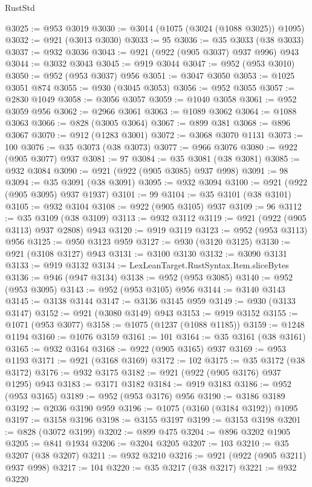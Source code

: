 \begin{lexlean}{RustStd}
\begin{coremodule}
@3025 := @953 @3019
@3030 := @3014 (@1075 (@3024 (@1088 @3025)) @1095)
@3032 := @921 (@3013 @3030)
@3033 := 95
@3036 := @35 @3033 (@38 @3033)
@3037 := @932 @3036
@3043 := @921 (@922 (@905 @3037) @937 @996) @943
@3044 := @3032 @3043
@3045 := @919 @3044
@3047 := @952 (@953 @3010)
@3050 := @952 (@953 @3037) @956
@3051 := @3047 @3050
@3053 := @1025 @3051 @874
@3055 := @930 (@3045 @3053)
@3056 := @952 @3055
@3057 := @2830 @1049
@3058 := @3056 @3057
@3059 := @1040 @3058
@3061 := @952 @3059 @956
@3062 := @2966 @3061
@3063 := @1089 @3062
@3064 := @1088 @3063
@3066 := @828 (@3005 @3064)
@3067 := @899 @381
@3068 := @896 @3067
@3070 := @912 (@1283 @3001)
@3072 := @3068 @3070 @1131
@3073 := 100
@3076 := @35 @3073 (@38 @3073)
@3077 := @966 @3076
@3080 := @922 (@905 @3077) @937
@3081 := 97
@3084 := @35 @3081 (@38 @3081)
@3085 := @932 @3084
@3090 := @921 (@922 (@905 @3085) @937 @998)
@3091 := 98
@3094 := @35 @3091 (@38 @3091)
@3095 := @932 @3094
@3100 := @921 (@922 (@905 @3095) @937 @1937)
@3101 := 99
@3104 := @35 @3101 (@38 @3101)
@3105 := @932 @3104
@3108 := @922 (@905 @3105) @937
@3109 := 96
@3112 := @35 @3109 (@38 @3109)
@3113 := @932 @3112
@3119 := @921 (@922 (@905 @3113) @937 @2808) @943
@3120 := @919 @3119
@3123 := @952 (@953 @3113) @956
@3125 := @950 @3123 @959
@3127 := @930 (@3120 @3125)
@3130 := @921 (@3108 @3127) @943
@3131 := @3100 @3130
@3132 := @3090 @3131
@3133 := @919 @3132
@3134 := LexLeanTarget.RustSyntax.Item.sliceBytes
@3136 := @946 (@947 @3134)
@3138 := @952 (@953 @3085)
@3140 := @952 (@953 @3095)
@3143 := @952 (@953 @3105) @956
@3144 := @3140 @3143
@3145 := @3138 @3144
@3147 := @3136 @3145 @959
@3149 := @930 (@3133 @3147)
@3152 := @921 (@3080 @3149) @943
@3153 := @919 @3152
@3155 := @1071 (@953 @3077)
@3158 := @1075 (@1237 (@1088 @1185))
@3159 := @1248 @1194
@3160 := @1076 @3159
@3161 := 101
@3164 := @35 @3161 (@38 @3161)
@3165 := @932 @3164
@3168 := @922 (@905 @3165) @937
@3169 := @953 @1193
@3171 := @921 (@3168 @3169)
@3172 := 102
@3175 := @35 @3172 (@38 @3172)
@3176 := @932 @3175
@3182 := @921 (@922 (@905 @3176) @937 @1295) @943
@3183 := @3171 @3182
@3184 := @919 @3183
@3186 := @952 (@953 @3165)
@3189 := @952 (@953 @3176) @956
@3190 := @3186 @3189
@3192 := @2036 @3190 @959
@3196 := @1075 (@3160 (@3184 @3192)) @1095
@3197 := @3158 @3196
@3198 := @3155 @3197
@3199 := @3153 @3198
@3201 := @828 (@3072 @3199)
@3202 := @899 @475
@3204 := @896 @3202 @1905
@3205 := @841 @1934
@3206 := @3204 @3205
@3207 := 103
@3210 := @35 @3207 (@38 @3207)
@3211 := @932 @3210
@3216 := @921 (@922 (@905 @3211) @937 @998)
@3217 := 104
@3220 := @35 @3217 (@38 @3217)
@3221 := @932 @3220

\end{coremodule}
\end{lexlean}
